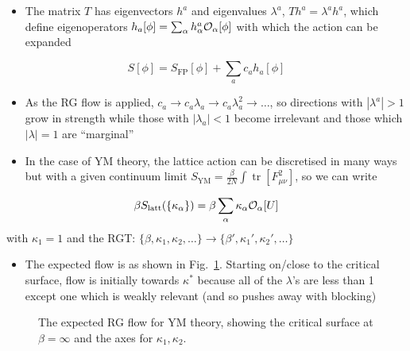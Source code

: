 \begin{itemize}
    \item The matrix $T$ has eigenvectors $h^a$ and eigenvalues $\lambda^a$, $T h^a = \lambda^a h^a$, which define eigenoperators $h_a[\phi] = \sum_\alpha h^a_\alpha \mathcal{O}_\alpha[\phi]$ with which the action can be expanded
\end{itemize}
\begin{equation}
    S[{\phi}] = S_\text{FP}[\phi] + \sum_a c_a h_a[\phi]
\end{equation}
\begin{itemize}
    \item As the RG flow is applied, $c_a \to c_a \lambda_a \to c_a \lambda_a^2 \to \ldots$, so directions with $|\lambda^a|>1$ grow in strength while those with $|\lambda_a|<1$ become irrelevant and those which $|\lambda| = 1$ are ``marginal''
    \item In the case of YM theory, the lattice action can be discretised in many ways but with a given continuum limit $S_\text{YM} = \frac{\beta}{2N}\int \operatorname{tr}[F_{\mu \nu}^2]$, so we can write
\end{itemize}
\begin{equation}
    \beta S_\text{latt}(\{\kappa_\alpha\}) = \beta \sum_\alpha \kappa_\alpha \mathcal{O}_\alpha[U] 
\end{equation}
with $\kappa_1 = 1$ and the RGT: $\{\beta, \kappa_1, \kappa_2, \ldots\} \to \{\beta', \kappa_1', \kappa_2', \ldots\}$
\begin{itemize}
    \item The expected flow is as shown in Fig.~\ref{fig:exp_flow}. Starting on/close to the critical surface, flow is initially towards $\kappa^\ast$ because all of the $\lambda$'s are less than 1 except one which is weakly relevant (and so pushes away with blocking)
\end{itemize}
\begin{figure}
    \centering
    \caption{The expected RG flow for YM theory, showing the critical surface at $\beta = \infty$ and the axes for $\kappa_1, \kappa_2$.
    \label{fig:exp_flow}}
\end{figure}
